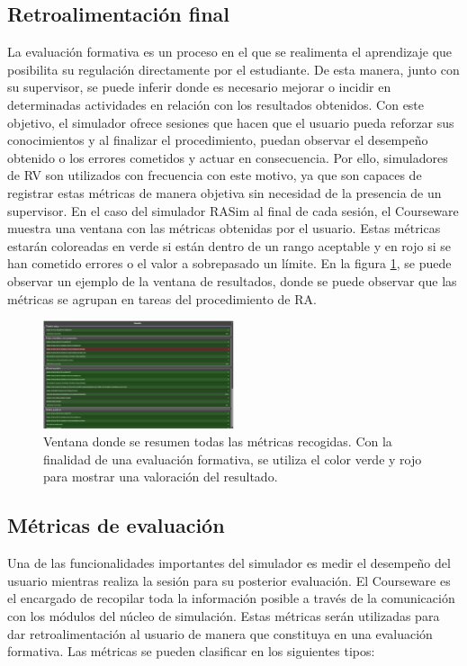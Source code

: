 \subsection{Retroalimentación final}
\label{course:feedback}
La evaluación formativa es un proceso en el que se realimenta el aprendizaje que posibilita su regulación directamente por el estudiante. De esta manera, junto con su supervisor, se puede inferir donde es necesario mejorar o incidir en determinadas actividades en relación con los resultados obtenidos. Con este objetivo, el simulador ofrece sesiones que hacen que el usuario pueda reforzar sus conocimientos y al finalizar el procedimiento, puedan observar el desempeño obtenido o los errores cometidos y actuar en consecuencia. Por ello, simuladores de \ac{RV} son utilizados con frecuencia con este motivo, ya que son capaces de registrar estas métricas de manera objetiva sin necesidad de la presencia de un supervisor. En el caso del simulador \ac{RASim} al final de cada sesión, el \ac{Courseware} muestra una ventana con las métricas obtenidas por el usuario. Estas métricas estarán coloreadas en verde si están dentro de un rango aceptable y en rojo si se han cometido errores o el valor a sobrepasado un límite. En la figura \ref{fig:resultui}, se puede observar un ejemplo de la ventana de resultados, donde se puede observar que las métricas se agrupan en tareas del procedimiento de \ac{RA}.



\begin{figure}[h]
    \centering
    \includegraphics[width=0.5\textwidth]{IMG/resultui.PNG}
    \caption{Ventana donde se resumen todas las métricas recogidas. Con la finalidad de una evaluación formativa, se utiliza el color verde y rojo para mostrar una valoración del resultado.}
    \label{fig:resultui}
\end{figure}


\subsection{Métricas de evaluación}
\label{course:metricas}
Una de las funcionalidades importantes del simulador es medir el desempeño del usuario mientras realiza la sesión para su posterior evaluación. El \ac{Courseware} es el encargado de recopilar toda la información posible a través de la comunicación con los módulos del núcleo de simulación. Estas métricas serán utilizadas para dar retroalimentación al usuario de manera que constituya en una evaluación formativa. Las métricas se pueden clasificar en los siguientes tipos:

